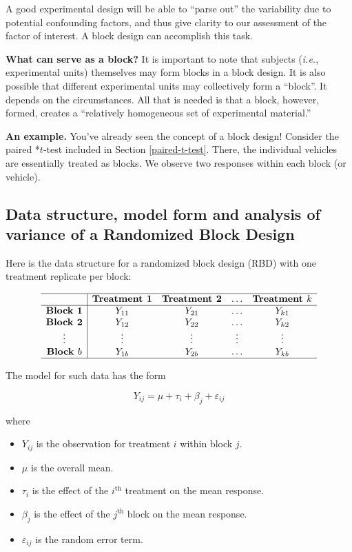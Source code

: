 \documentclass[
]{book}
\providecommand{\tightlist}{%
  \setlength{\itemsep}{0pt}\setlength{\parskip}{0pt}}
\begin{document}
A good experimental design will be able to ``parse out'' the variability due to potential confounding factors, and thus give clarity to our assessment of the factor of interest.
A block design can accomplish this task.

\textbf{What can serve as a block?} It is important to note that subjects (\emph{i.e.}, experimental units) themselves may form blocks in a block design. It is also possible that different experimental units may collectively form a ``block''. It depends on the circumstances. All that is needed is that a block, however, formed, creates a ``relatively homogeneous set of experimental material.''

\textbf{An example.} You've already seen the concept of a block design! Consider the paired *\(t\)-test included in Section \ref{paired-t-test}. There, the individual vehicles are essentially treated as blocks.
We observe two responses within each block (or vehicle).

\hypertarget{data-structure-model-form-and-analysis-of-variance-of-a-randomized-block-design}{%
\subsection{Data structure, model form and analysis of variance of a Randomized Block Design}\label{data-structure-model-form-and-analysis-of-variance-of-a-randomized-block-design}}

Here is the data structure for a randomized block design (RBD) with one treatment replicate per block:

\[\begin{array}{c|cccc}
\hline
         & \textbf{Treatment 1} & \textbf{Treatment 2} & \ldots & \textbf{Treatment } k \\
\hline
\textbf{Block 1} & Y_{11} & Y_{21} & \ldots & Y_{k1} \\
\textbf{Block 2} & Y_{12} & Y_{22} & \ldots & Y_{k2} \\
\vdots & \vdots & \vdots & \vdots & \vdots \\
\textbf{Block } b & Y_{1b} & Y_{2b} & \ldots & Y_{kb} \\
\hline
\end{array}\]

The model for such data has the form

\[Y_{ij} = \mu + \tau_i + \beta_j + \varepsilon_{ij}\]

where

\begin{itemize}
\tightlist
\item
  \(Y_{ij}\) is the observation for treatment \(i\) within block \(j\).
\item
  \(\mu\) is the overall mean.
\item
  \(\tau_i\) is the effect of the \(i^\mathrm{th}\) treatment on the mean response.
\item
  \(\beta_j\) is the effect of the \(j^\mathrm{th}\) block on the mean response.
\item
  \(\varepsilon_{ij}\) is the random error term.
\end{itemize}
\end{document}
